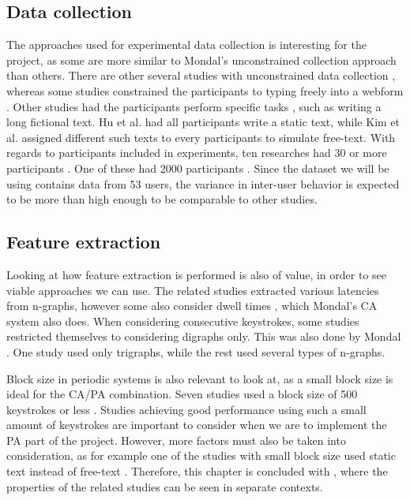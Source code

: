 \documentclass[informationsecurity]{gucmasterproject}
\begin{document}
\subsection{Data collection}
\label{sec:related-overview-collection}
The approaches used for experimental data collection is interesting for the project, as some are more similar to Mondal's \cite{mondal} unconstrained collection approach than others.
There are other several studies with unconstrained data collection \cite{Pinto2014, Ahmed, superResults, Janakiraman2007, sliding, BOURS201236}, whereas some studies constrained the participants to typing freely into a webform \cite{gnp, Solami, davoudi2009, davoudi2010}.
Other studies had the participants perform specific tasks \cite{900words, monaco, Monrose, KIM2017, park}, such as writing a long fictional text.
Hu et al. \cite{hu} had all participants write a static text, while Kim et al. \cite{KIM2017} assigned different such texts to every participants to simulate free-text.
With regards to participants included in experiments, ten researches had 30 or more participants \cite{Messerman, gnp, Ahmed, superResults, KIM2017, 900words, sliding, Monrose, park, monaco}.
One of these had 2000 participants \cite{900words}.
Since the dataset we will be using \cite{mondal} contains data from 53 users, the variance in inter-user behavior is expected to be more than high enough to be comparable to other studies.

\subsection{Feature extraction}
Looking at how feature extraction is performed is also of value, in order to see viable approaches we can use.
The related studies extracted various latencies from n-graphs, however some also consider dwell times \cite{Pinto2014, superResults, KIM2017, Ahmed, Monrose, Janakiraman2007, monaco, BOURS201236}, which Mondal's \cite{mondal} CA system also does.
When considering consecutive keystrokes, some studies \cite{davoudi2009, davoudi2010, KIM2017, Ahmed, Janakiraman2007, Solami, BOURS201236, Monrose, park, monaco} restricted themselves to considering digraphs only.
This was also done by Mondal \cite{mondal}.
One study \cite{900words} used only trigraphs, while the rest used several types of n-graphs.

Block size in periodic systems is also relevant to look at, as a small block size is ideal for the CA/PA combination.
Seven studies used a block size of 500 keystrokes or less \cite{superResults, Messerman, Pinto2014, Ahmed, hu, park}.
Studies achieving good performance using such a small amount of keystrokes are important to consider when we are to implement the PA part of the project.
However, more factors must also be taken into consideration, as for example one of the studies with small block size used static text instead of free-text \cite{hu}.
Therefore, this chapter is concluded with , where the properties of the related studies can be seen in separate contexts.
\end{document}
